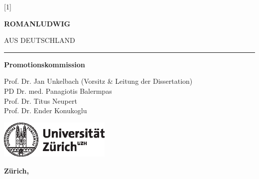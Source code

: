 \documentclass[\relativeRoot/main.tex]{subfiles}
\begin{document}
\begin{titlepage}
\begin{center}
            \scalebox{1.2}[1]{\begin{minipage}{0.7\textwidth}
                \centering
                \bfseries
                \huge
                \ttfamily
                ROMAN\hspace{2.5mm}LUDWIG
            \end{minipage}} \vfill

            {\footnotesize AUS DEUTSCHLAND} \vspace{3cm}
            
            \rule{2cm}{0.5pt} \vspace{5mm}
            
            \textbf{Promotionskommission}

            Prof. Dr. {\sc Jan Unkelbach} {\small (Vorsitz \& Leitung der Dissertation)}\\
            PD Dr. med. {\sc Panagiotis Balermpas}\\
            Prof. Dr. {\sc Titus Neupert}\\
            Prof. Dr. {\sc Ender Konukoglu}
            \vfill

            \includegraphics[width=0.4\textwidth]{figures/uzh_logo}
            \vfill

            \textbf{Zürich, \thedate} \vfill
                
        \end{center}
    \end{titlepage}
\end{document}
